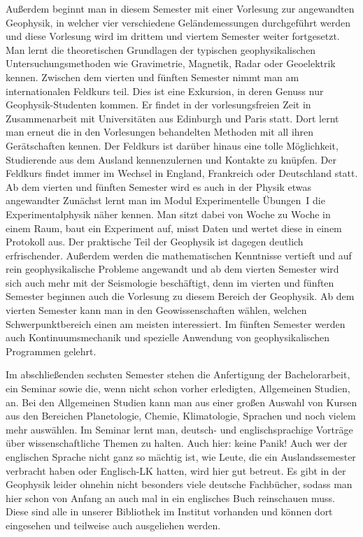 \begin{multicols}{2}
Außerdem beginnt man in diesem Semester mit einer Vorlesung zur angewandten Geophysik, in welcher vier verschiedene Geländemessungen durchgeführt werden und diese Vorlesung wird im drittem und viertem Semester weiter fortgesetzt.
Man lernt die theoretischen Grundlagen der typischen geophysikalischen Untersuchungsmethoden wie Gravimetrie, Magnetik, Radar oder Geoelektrik kennen.
Zwischen dem vierten und fünften Semester nimmt man am internationalen Feldkurs teil.
Dies ist eine Exkursion, in deren Genuss nur Geophysik-Studenten kommen.
Er findet in der vorlesungsfreien Zeit in Zusammenarbeit mit Universitäten aus Edinburgh und Paris statt.
Dort lernt man erneut die in den Vorlesungen behandelten Methoden mit all ihren Gerätschaften kennen.
Der Feldkurs ist darüber hinaus eine tolle Möglichkeit, Studierende aus dem Ausland kennenzulernen und Kontakte zu knüpfen.
Der Feldkurs findet immer im Wechsel in England, Frankreich oder Deutschland statt.
Ab dem vierten und fünften Semester wird es auch in der Physik etwas angewandter
Zunächst lernt man im Modul Experimentelle Übungen~I die Experimentalphysik näher kennen.
Man sitzt dabei von Woche zu Woche in einem Raum, baut ein Experiment auf, misst Daten und wertet diese in einem Protokoll aus.
Der praktische Teil der Geophysik ist dagegen deutlich erfrischender.
Außerdem werden die mathematischen Kenntnisse vertieft und auf rein geophysikalische Probleme angewandt und ab dem vierten Semester wird sich auch mehr mit der Seismologie beschäftigt, denn im vierten und fünften Semester beginnen auch die Vorlesung zu diesem Bereich der Geophysik.
Ab dem vierten Semester kann man in den Geowissenschaften wählen, welchen Schwerpunktbereich einen am meisten interessiert. 
Im fünften Semester werden  auch Kontinuumsmechanik und spezielle Anwendung von geophysikalischen Programmen gelehrt.

Im abschließenden sechsten Semester stehen die Anfertigung der Bachelorarbeit, ein Seminar sowie die, wenn nicht schon vorher erledigten, Allgemeinen Studien, an. Bei den Allgemeinen Studien kann man aus einer großen Auswahl von Kursen aus den Bereichen Planetologie, Chemie, Klimatologie, Sprachen und noch vielem mehr auswählen. Im Seminar lernt man, deutsch- und englischsprachige Vorträge über wissenschaftliche Themen zu halten. Auch hier: keine Panik! Auch wer der englischen Sprache nicht ganz so mächtig ist, wie Leute, die ein Auslandssemester verbracht haben oder Englisch-LK hatten, wird hier gut betreut. Es gibt in der Geophysik leider ohnehin nicht besonders viele deutsche Fachbücher, sodass man hier schon von Anfang an auch mal in ein englisches Buch reinschauen muss. Diese sind alle in unserer Bibliothek im Institut vorhanden und können dort eingesehen und teilweise auch ausgeliehen werden.



\end{multicols}
